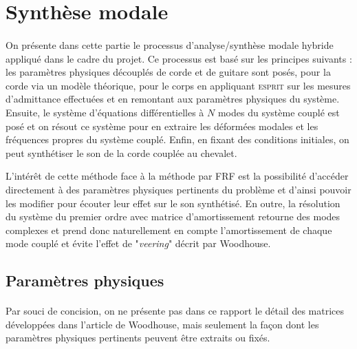 %
%
%
%


\section{Synthèse modale}

\paragraph{}
  On présente dans cette partie le processus d'analyse/synthèse modale hybride
appliqué dans le cadre du projet. Ce processus est basé sur les principes
suivants : les paramètres physiques découplés de corde et de guitare sont
posés, pour la corde via un modèle théorique, pour le corps en appliquant
\textsc{esprit} sur les mesures d'admittance effectuées et en remontant aux
paramètres physiques du système.
  Ensuite, le système d'équations différentielles à \( N \) modes du système
couplé est posé et on résout ce système pour en extraire les déformées modales
et les fréquences propres du système couplé. Enfin, en fixant des
conditions initiales, on peut synthétiser le son de la corde couplée au
chevalet.

  L'intérêt de cette méthode face à la méthode par FRF est la possibilité
d'accéder directement à des paramètres physiques pertinents du problème et
d'ainsi pouvoir les modifier pour écouter leur effet sur le son synthétisé.
  En outre, la résolution du système du premier ordre avec matrice
d'amortissement retourne des modes complexes et prend donc naturellement en
compte l'amortissement de chaque mode couplé et évite l'effet de
"\emph{veering}" décrit par Woodhouse.

\subsection{Paramètres physiques}

\paragraph{}
  Par souci de concision, on ne présente pas dans ce rapport le détail des
matrices développées dans l'article de Woodhouse, mais seulement la façon dont
les paramètres physiques pertinents peuvent être extraits ou fixés.


